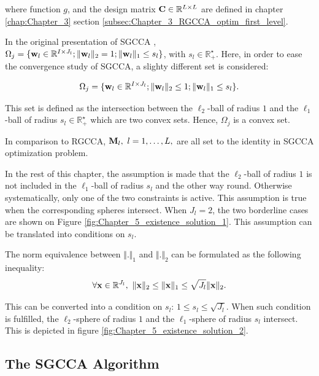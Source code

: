 \documentclass[
]{jss}
\begin{document}
where function \(g\), and the design matrix
\(\mathbf{C}\in\mathbb{R}^{L\times L}\) are defined in chapter
\ref{chap:Chapter_3} section
\ref{subsec:Chapter_3_RGCCA_optim_first_level}.

In the original presentation of SGCCA ,
\(\Omega_j = \lbrace \mathbf{w}_l\in\mathbb{R}^{I\times J_l}; \Vert \mathbf{w}_l \Vert_2 = 1; \Vert \mathbf{w}_l \Vert_1 \leq s_l\rbrace\),
with \(s_l \in \mathbb{R}_+^\star\). Here, in order to ease the
convergence study of SGCCA, a slighty different set is considered:

\begin{equation}
    \Omega_j = \lbrace \mathbf{w}_l\in\mathbb{R}^{I\times J_l}; \Vert \mathbf{w}_l \Vert_2 \leq 1; \Vert \mathbf{w}_l \Vert_1 \leq s_l\rbrace.
    \label{eq:Chapter_5_sgcca_optim_constr}
\end{equation}

This set is defined as the intersection between the \(\ell_2\)-ball of
radius \(1\) and the \(\ell_1\)-ball of radius
\(s_l \in \mathbb{R}_+^\star\) which are two convex sets. Hence,
\(\Omega_j\) is a convex set.

In comparison to RGCCA, \(\mathbf{M}_l, ~ l=1, \ldots, L,\) are all set to the
identity in SGCCA optimization problem.

In the rest of this chapter, the assumption is made that the
\(\ell_2\)-ball of radius \(1\) is not included in the \(\ell_1\)-ball
of radius \(s_l\) and the other way round. Otherwise systematically,
only one of the two constraints is active. This assumption is true when
the corresponding spheres intersect. When \(J_l=2\), the two borderline
cases are shown on Figure \ref{fig:Chapter_5_existence_solution_1}. This
assumption can be translated into conditions on \(s_l\).

The norm equivalence between \(\Vert . \Vert_1\) and \(\Vert . \Vert_2\)
can be formulated as the following inequality: \begin{equation}
    \forall \mathbf{x} \in \mathbb{R}^{J_l}, ~ \Vert \mathbf{x} \Vert_2 \leq \Vert \mathbf{x} \Vert_1 \leq \sqrt{J_l}\Vert \mathbf{x} \Vert_2.
\label{eq:Chapter_5_existence_conditions}
\end{equation}

This can be converted into a condition on \(s_l\):
\(1 \leq s_l \leq \sqrt{J_l}\). When such condition is fulfilled, the
\(\ell_2\)-sphere of radius \(1\) and the \(\ell_1\)-sphere of radius
\(s_l\) intersect. This is depicted in figure
\ref{fig:Chapter_5_existence_solution_2}.

\hypertarget{the-sgcca-algorithm}{%
\subsection{The SGCCA Algorithm}\label{the-sgcca-algorithm}}
\end{document}
